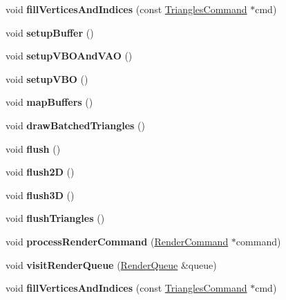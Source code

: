 \begin{DoxyCompactItemize}
\item 
\mbox{\label{classRenderer_ac39336baefebfe1091a627e13794fdc1}} 
void {\bfseries fill\+Vertices\+And\+Indices} (const \hyperlink{classTrianglesCommand}{Triangles\+Command} $\ast$cmd)
\item 
\mbox{\label{classRenderer_a846c8036d380c3651582da600d1eadd5}} 
void {\bfseries setup\+Buffer} ()
\item 
\mbox{\label{classRenderer_a84977862635dd200da3957b89c16b4f9}} 
void {\bfseries setup\+V\+B\+O\+And\+V\+AO} ()
\item 
\mbox{\label{classRenderer_acd535a88b6879d4e50e6717bcb01e46f}} 
void {\bfseries setup\+V\+BO} ()
\item 
\mbox{\label{classRenderer_a4471709c3a5b0812436d2939d5078cf1}} 
void {\bfseries map\+Buffers} ()
\item 
\mbox{\label{classRenderer_aacd5c7ce668eef51b001932e5d780eb8}} 
void {\bfseries draw\+Batched\+Triangles} ()
\item 
\mbox{\label{classRenderer_a35401aa28259d4560aba5cebd2bac4e3}} 
void {\bfseries flush} ()
\item 
\mbox{\label{classRenderer_aba52cc3f450185b08b001921044325f8}} 
void {\bfseries flush2D} ()
\item 
\mbox{\label{classRenderer_abe15dfa1eabb3fa26b3c377fada8c379}} 
void {\bfseries flush3D} ()
\item 
\mbox{\label{classRenderer_a447a83b11eec6bfa491a1f1058c819bd}} 
void {\bfseries flush\+Triangles} ()
\item 
\mbox{\label{classRenderer_a2eecd62d7c2ce2f2d68c84999280f4fe}} 
void {\bfseries process\+Render\+Command} (\hyperlink{classRenderCommand}{Render\+Command} $\ast$command)
\item 
\mbox{\label{classRenderer_a7e7e019d797e1f4acd25a8673aed2fef}} 
void {\bfseries visit\+Render\+Queue} (\hyperlink{classRenderQueue}{Render\+Queue} \&queue)
\item 
\mbox{\label{classRenderer_ac39336baefebfe1091a627e13794fdc1}} 
void {\bfseries fill\+Vertices\+And\+Indices} (const \hyperlink{classTrianglesCommand}{Triangles\+Command} $\ast$cmd)
\end{DoxyCompactItemize}

